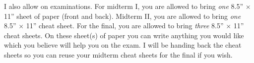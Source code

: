 I also allow  on examinations. For midterm I, you are allowed to bring \textit{one} 8.5'' $\times$ 11'' sheet of paper (front and back).  Midterm II, you are allowed to bring \textit{one} 8.5'' $\times$ 11'' cheat sheet. For the final, you are allowed to bring \textit{three} 8.5'' $\times$ 11'' cheat sheets.   On these sheet(s) of paper you can write anything you would like which you believe will help you on the exam. I will be handing back the cheat sheets so you can reuse your midterm cheat sheets for the final if you wish. 